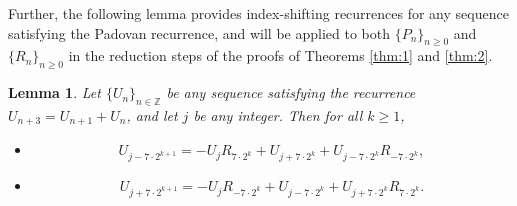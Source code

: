 \documentclass[11pt,a4paper]{article}
\newtheorem{lemma}[theorem]{Lemma}
\numberwithin{equation}{section}
\numberwithin{table}{section}
\numberwithin{figure}{section}
\begin{document}
Further, the following lemma provides index-shifting recurrences for any sequence satisfying the Padovan recurrence, and will be applied to both $\{P_n\}_{n\ge 0}$ and $\{R_n\}_{n\ge 0}$ in the reduction steps of the proofs of Theorems \ref{thm:1} and \ref{thm:2}.
\begin{lemma}\label{lem:shift}
	Let $\{U_n\}_{n\in\mathbb{Z}}$ be any sequence satisfying 
	the recurrence $U_{n+3} = U_{n+1} + U_n$, and let $j$ be 
	any integer. Then for all $k \ge 1$,
	\begin{itemize}
		\item[\rm(i)]
		\begin{equation*}
			U_{j-7\cdot 2^{k+1}} = -U_j R_{7\cdot 2^k} 
			+ U_{j+7\cdot 2^k} + U_{j-7\cdot 2^k}R_{-7\cdot 2^k},
		\end{equation*}
		\item[\rm(ii)]
		\begin{equation*}
			U_{j+7\cdot 2^{k+1}} = -U_j R_{-7\cdot 2^k} 
			+ U_{j-7\cdot 2^k} + U_{j+7\cdot 2^k}R_{7\cdot 2^k}.
		\end{equation*}
	\end{itemize}
\end{lemma}
\end{document}
